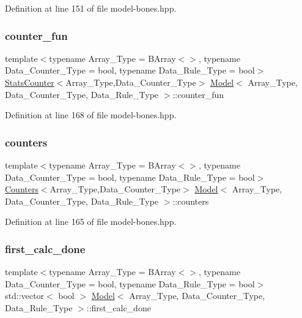 Definition at line 151 of file model-\/bones.\+hpp.

\mbox{\label{class_model_a2bb5ec8af1a49bcb2da6c5f9f2374b15}} 
\subsubsection{\texorpdfstring{counter\+\_\+fun}{counter\_fun}}
{\footnotesize\ttfamily template$<$typename Array\+\_\+\+Type = B\+Array$<$$>$, typename Data\+\_\+\+Counter\+\_\+\+Type = bool, typename Data\+\_\+\+Rule\+\_\+\+Type = bool$>$ \\
\hyperlink{class_stats_counter}{Stats\+Counter}$<$Array\+\_\+\+Type,Data\+\_\+\+Counter\+\_\+\+Type$>$ \hyperlink{class_model}{Model}$<$ Array\+\_\+\+Type, Data\+\_\+\+Counter\+\_\+\+Type, Data\+\_\+\+Rule\+\_\+\+Type $>$\+::counter\+\_\+fun}



Definition at line 168 of file model-\/bones.\+hpp.

\mbox{\label{class_model_a3189eb46eed19f865ca0aa3f6b191c78}} 
\subsubsection{\texorpdfstring{counters}{counters}}
{\footnotesize\ttfamily template$<$typename Array\+\_\+\+Type = B\+Array$<$$>$, typename Data\+\_\+\+Counter\+\_\+\+Type = bool, typename Data\+\_\+\+Rule\+\_\+\+Type = bool$>$ \\
\hyperlink{class_counters}{Counters}$<$Array\+\_\+\+Type,Data\+\_\+\+Counter\+\_\+\+Type$>$ \hyperlink{class_model}{Model}$<$ Array\+\_\+\+Type, Data\+\_\+\+Counter\+\_\+\+Type, Data\+\_\+\+Rule\+\_\+\+Type $>$\+::counters}



Definition at line 165 of file model-\/bones.\+hpp.

\mbox{\label{class_model_a942b2cdb7472878fa17c5068680441c6}} 
\subsubsection{\texorpdfstring{first\+\_\+calc\+\_\+done}{first\_calc\_done}}
{\footnotesize\ttfamily template$<$typename Array\+\_\+\+Type = B\+Array$<$$>$, typename Data\+\_\+\+Counter\+\_\+\+Type = bool, typename Data\+\_\+\+Rule\+\_\+\+Type = bool$>$ \\
std\+::vector$<$ bool $>$ \hyperlink{class_model}{Model}$<$ Array\+\_\+\+Type, Data\+\_\+\+Counter\+\_\+\+Type, Data\+\_\+\+Rule\+\_\+\+Type $>$\+::first\+\_\+calc\+\_\+done}



